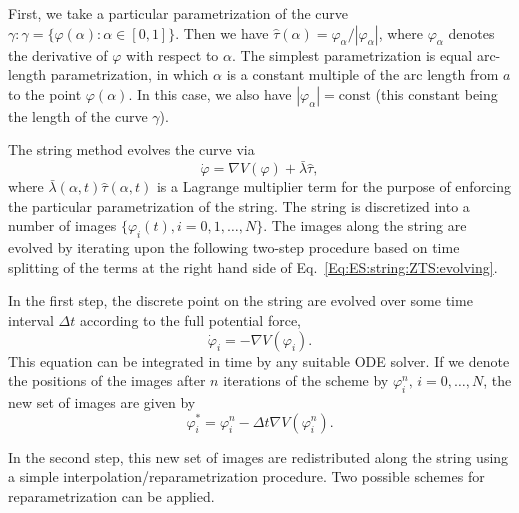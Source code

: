 First, we take a particular parametrization of the curve $\gamma:\gamma=\{\varphi(\alpha):\alpha\in[0,1]\}$. Then we have $\hat{\tau}(\alpha)=\varphi_\alpha/|\varphi_\alpha|$, where $\varphi_\alpha$ denotes the derivative of $\varphi$ with respect to $\alpha$. The simplest parametrization is equal arc-length parametrization, in which $\alpha$ is a constant multiple of the arc length from $a$ to the point $\varphi(\alpha)$. In this case, we also have $|\varphi_\alpha|=\mathrm{const}$ (this constant being the length of the curve $\gamma$).

The string method evolves the curve via
\begin{equation}
    \dot{\varphi}=\nabla V(\varphi)+\bar{\lambda}\hat{\tau},
    \label{Eq:ES:string:ZTS:evolving}
\end{equation}
where $\bar{\lambda}(\alpha,t)\hat{\tau}(\alpha,t)$ is a Lagrange multiplier term for the purpose of enforcing the particular parametrization of the string. The string is discretized into a number of images $\{\varphi_i(t),i=0,1,\dots,N\}$. The images along the string are evolved by iterating upon the following two-step procedure based on time splitting of the terms at the right hand side of Eq.~\ref{Eq:ES:string:ZTS:evolving}.

In the first step, the discrete point on the string are evolved over some time interval $\Delta t$ according to the full potential force,
\begin{equation}
    \dot{\varphi}_i=-\nabla V(\varphi_i).
\end{equation}
This equation can be integrated in time by any suitable ODE solver. If we denote the positions of the images after $n$ iterations of the scheme by $\varphi_i^n,\,i=0,\dots,N$, the new set of images are given by
\begin{equation}
    \varphi_i^\ast=\varphi_i^n-\Delta t\nabla V(\varphi_i^n).
\end{equation}

In the second step, this new set of images are redistributed along the string using a simple interpolation/reparametrization procedure. Two possible schemes for reparametrization can be applied.


